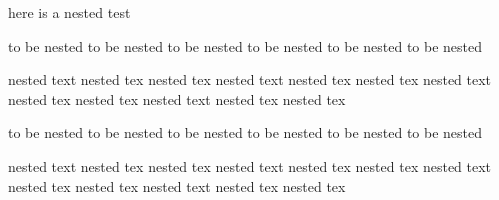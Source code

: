 here is a nested test
\begin{one}
  to be nested to be nested
  to be nested to be nested
  to be nested to be nested
  \begin{two}
    nested text nested tex nested tex
    nested text nested tex nested tex
    nested text nested tex nested tex
    nested text nested tex nested tex
    \end{two}
\end{one}
\begin{one}
  to be nested to be nested
  to be nested to be nested
  to be nested to be nested
  \begin{two}
    nested text nested tex nested tex
    nested text nested tex nested tex
    nested text nested tex nested tex
    nested text nested tex nested tex
    \end{two}
\end{one}

